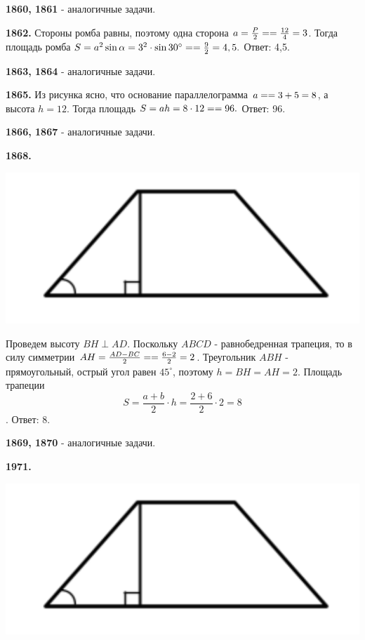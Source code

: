 \textbf{1860, 1861} - аналогичные задачи.

\textbf{1862.} Стороны ромба равны, поэтому одна сторона $a = \frac{P}{2} = \linebreak = \frac{12}{4} = 3$. Тогда площадь ромба $S = a^2\sin{\alpha} = 3^2\cdot\sin{30^\circ} = \linebreak = \frac{9}{2} = 4,5.$ \newline \null \hspace*{\fill} Ответ: 4,5.

\textbf{1863, 1864} - аналогичные задачи.

\textbf{1865.} Из рисунка ясно, что основание параллелограмма $a = \linebreak = 3+ 5 = 8$, а высота $h = 12$. Тогда площадь $S = ah = 8\cdot12=\linebreak=96.$ \newline \null \hspace*{\fill} Ответ: 96.

\textbf{1866, 1867} - аналогичные задачи.

\textbf{1868.}

{\centering \includegraphics[width=0.5\linewidth]{Geometry/Content/20.png}
	
}

Проведем  высоту $BH \perp AD$.  Поскольку $ABCD$ - равнобедренная трапеция, то в силу симметрии $AH = \frac{AD - BC}{2} = \linebreak = \frac{6 - 2}{2} = 2$. Треугольник $ABH$ - прямоугольный, острый угол равен $45^\circ$, поэтому $h =BH = AH = 2$. Площадь трапеции
\[
S = \frac{a + b}{2}\cdot h=\frac{2 + 6}{2}\cdot 2 = 8
\].\null \hspace*{\fill} Ответ: 8.

\textbf{1869, 1870} - аналогичные задачи. 

\clearpage

\textbf{1971.}

{\centering \includegraphics[width=0.5\linewidth]{Geometry/Content/20.png}
	
}

